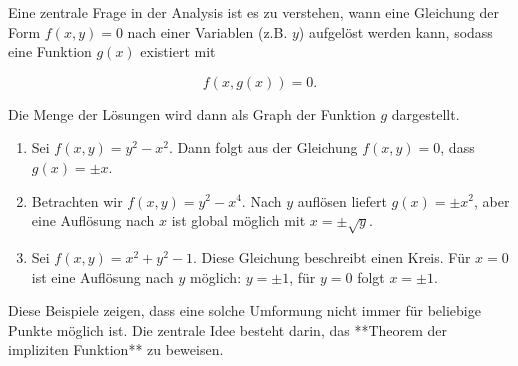 Eine zentrale Frage in der Analysis ist es zu verstehen, wann eine Gleichung der Form $ f(x,y) = 0 $ nach einer Variablen (z.B. $ y $) aufgelöst werden kann, sodass eine Funktion $ g(x) $ existiert mit 


$$
f(x, g(x)) = 0.
$$


Die Menge der Lösungen wird dann als Graph der Funktion $ g $ dargestellt.

\begin{beispielbox}
\begin{enumerate}
    \item Sei $ f(x,y) = y^2 - x^2 $. Dann folgt aus der Gleichung $ f(x,y) = 0 $, dass $ g(x) = \pm x $. 
    \item Betrachten wir $ f(x,y) = y^2 - x^4 $. Nach $ y $ auflösen liefert $ g(x) = \pm x^2 $, aber eine Auflösung nach $ x $ ist global möglich mit $ x = \pm \sqrt{y} $.
    \item Sei $ f(x,y) = x^2 + y^2 - 1 $. Diese Gleichung beschreibt einen Kreis. Für $ x = 0 $ ist eine Auflösung nach $ y $ möglich: $ y = \pm 1 $, für $ y=0 $ folgt $ x = \pm 1 $.
\end{enumerate}
\end{beispielbox}

\begin{bemerkungbox}
Diese Beispiele zeigen, dass eine solche Umformung nicht immer für beliebige Punkte möglich ist. Die zentrale Idee besteht darin, das **Theorem der impliziten Funktion** zu beweisen.
\end{bemerkungbox}